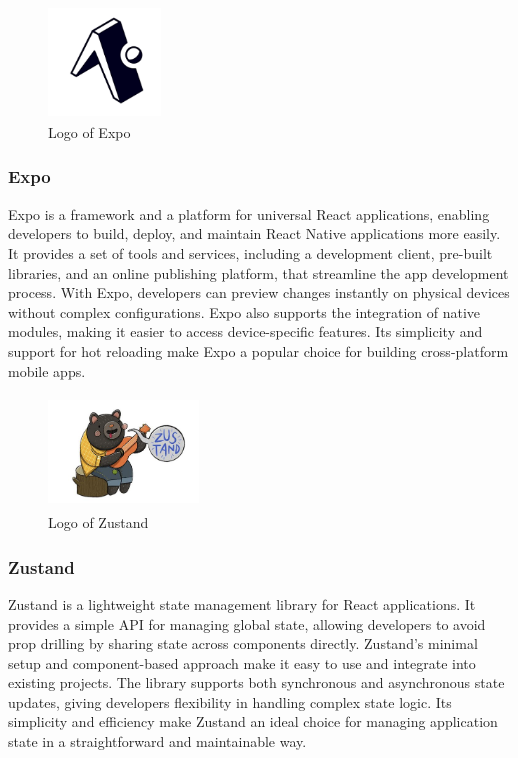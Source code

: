 \documentclass[conference]{IEEEtran}
\begin{document}
        \begin{figure}[htbp]
            \centerline{\includegraphics[width=3cm, height=3cm]{Images/logo/expo.png}}
            \caption{Logo of Expo}
            \label{fig}
        \end{figure}
        \subsubsection{Expo}
            Expo is a framework and a platform for universal React applications, enabling developers to build, deploy, and maintain React Native applications more easily. It provides a set of tools and services, including a development client, pre-built libraries, and an online publishing platform, that streamline the app development process. With Expo, developers can preview changes instantly on physical devices without complex configurations. Expo also supports the integration of native modules, making it easier to access device-specific features. Its simplicity and support for hot reloading make Expo a popular choice for building cross-platform mobile apps.

        \begin{figure}[htbp]
            \centerline{\includegraphics[width=4cm, height=3cm]{Images/logo/zustand.png}}
            \caption{Logo of Zustand}
            \label{fig}
        \end{figure}
        \subsubsection{Zustand}
            Zustand is a lightweight state management library for React applications. It provides a simple API for managing global state, allowing developers to avoid prop drilling by sharing state across components directly. Zustand's minimal setup and component-based approach make it easy to use and integrate into existing projects. The library supports both synchronous and asynchronous state updates, giving developers flexibility in handling complex state logic. Its simplicity and efficiency make Zustand an ideal choice for managing application state in a straightforward and maintainable way.
\end{document}
